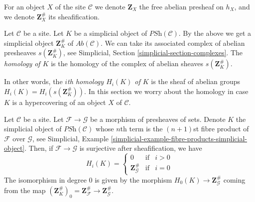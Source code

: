 \medskip\noindent
For an object $X$ of the site $\mathcal{C}$ we denote
$\mathbf{Z}_X$ the free abelian presheaf on $h_X$, and
we denote $\mathbf{Z}_X^\#$ its sheafification.

\begin{definition}
\label{definition-homology}
Let $\mathcal{C}$ be a site.
Let $K$ be a simplicial object of $\textit{PSh}(\mathcal{C})$.
By the above we get a simplicial object $\mathbf{Z}_K^\#$ of
$\textit{Ab}(\mathcal{C})$. We can take its associated
complex of abelian presheaves $s(\mathbf{Z}_K^\#)$, see
Simplicial, Section \ref{simplicial-section-complexes}.
The {\it homology of $K$} is the homology of the
complex of abelian sheaves $s(\mathbf{Z}_K^\#)$.
\end{definition}

\noindent
In other words, the {\it $i$th homology $H_i(K)$ of $K$}
is the sheaf of abelian groups $H_i(K) = H_i(s(\mathbf{Z}_K^\#))$.
In this section we worry about the homology in case $K$
is a hypercovering of an object $X$ of $\mathcal{C}$.

\begin{lemma}
\label{lemma-compare-cosk0}
Let $\mathcal{C}$ be a site.
Let $\mathcal{F} \to \mathcal{G}$ be a morphism
of presheaves of sets. Denote $K$ the simplicial
object of $\textit{PSh}(\mathcal{C})$ whose $n$th
term is the $(n + 1)$st fibre product of $\mathcal{F}$
over $\mathcal{G}$, see
Simplicial, Example \ref{simplicial-example-fibre-products-simplicial-object}.
Then, if $\mathcal{F} \to \mathcal{G}$ is surjective after
sheafification, we have
$$
H_i(K) =
\left\{
\begin{matrix}
0 & \text{if} & i > 0\\
\mathbf{Z}_\mathcal{G}^\# & \text{if} & i = 0
\end{matrix}
\right.
$$
The isomorphism in degree $0$ is given by the
morphism $H_0(K) \to \mathbf{Z}_\mathcal{G}^\#$
coming from the map $(\mathbf{Z}_K^\#)_0 =
\mathbf{Z}_\mathcal{F}^\# \to \mathbf{Z}_\mathcal{G}^\#$.
\end{lemma}

